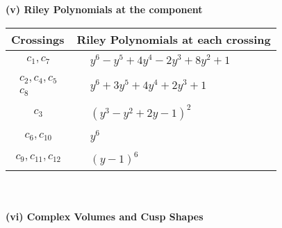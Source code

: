 \documentclass[1p]{elsarticle_modified}
\theoremstyle{definition}
\begin{document}
\newpage\renewcommand{\arraystretch}{1}
\flushleft \textbf{(v) Riley Polynomials at the component}\newline \\
\begin{tabular}{m{50pt}|m{274pt}}
Crossings & \hspace{64pt}Riley Polynomials at each crossing \\
\hline $$\begin{aligned}c_{1},c_{7}\end{aligned}$$&$\begin{aligned}
&y^6- y^5+4 y^4-2 y^3+8 y^2+1
\end{aligned}$\\
\hline $$\begin{aligned}c_{2},c_{4},c_{5}\\c_{8}\end{aligned}$$&$\begin{aligned}
&y^6+3 y^5+4 y^4+2 y^3+1
\end{aligned}$\\
\hline $$\begin{aligned}c_{3}\end{aligned}$$&$\begin{aligned}
&(y^3- y^2+2 y-1)^2
\end{aligned}$\\
\hline $$\begin{aligned}c_{6},c_{10}\end{aligned}$$&$\begin{aligned}
&y^6
\end{aligned}$\\
\hline $$\begin{aligned}c_{9},c_{11},c_{12}\end{aligned}$$&$\begin{aligned}
&(y-1)^6
\end{aligned}$\\
\hline
\end{tabular}\\~\\
\newpage\flushleft \textbf{(vi) Complex Volumes and Cusp Shapes}
\end{document}
